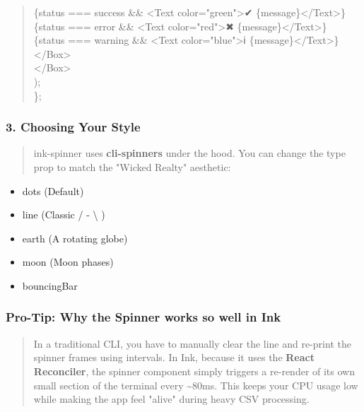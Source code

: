 \documentclass[
]{article}
\begin{document}
\begin{quote}
\{status === \textquotesingle success\textquotesingle{} \&\&
\textless Text color="green"\textgreater✔
\{message\}\textless/Text\textgreater\}\\
\{status === \textquotesingle error\textquotesingle{} \&\&
\textless Text color="red"\textgreater✖
\{message\}\textless/Text\textgreater\}\\
\{status === \textquotesingle warning\textquotesingle{} \&\&
\textless Text color="blue"\textgreater ℹ
\{message\}\textless/Text\textgreater\}\\
\textless/Box\textgreater{}\\
\textless/Box\textgreater{}\\
);\\
\};
\end{quote}

\hypertarget{choosing-your-style}{%
\subsubsection{\texorpdfstring{\textbf{3. Choosing Your
Style}}{3. Choosing Your Style}}\label{choosing-your-style}}

\begin{quote}
ink-spinner uses \textbf{cli-spinners} under the hood. You can change
the type prop to match the "Wicked Realty" aesthetic:
\end{quote}

\begin{itemize}
\item
  dots (Default)
\item
  line (Classic / - \textbackslash{} \textbar)
\item
  earth (A rotating globe)
\item
  moon (Moon phases)
\item
  bouncingBar
\end{itemize}

\hypertarget{pro-tip-why-the-spinner-works-so-well-in-ink}{%
\subsubsection{\texorpdfstring{\textbf{Pro-Tip: Why the Spinner works so
well in
Ink}}{Pro-Tip: Why the Spinner works so well in Ink}}\label{pro-tip-why-the-spinner-works-so-well-in-ink}}

\begin{quote}
In a traditional CLI, you have to manually clear the line and re-print
the spinner frames using intervals. In Ink, because it uses the
\textbf{React Reconciler}, the spinner component simply triggers a
re-render of its own small section of the terminal every
\textasciitilde80ms. This keeps your CPU usage low while making the app
feel "alive" during heavy CSV processing.
\end{quote}
\end{document}
